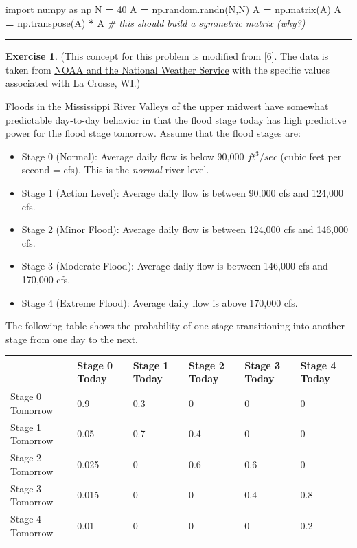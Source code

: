 \documentclass[
]{book}
\newenvironment{Shaded}{\begin{snugshade}}{\end{snugshade}}
\newcommand{\CommentTok}[1]{\textcolor[rgb]{0.56,0.35,0.01}{\textit{#1}}}
\newcommand{\DecValTok}[1]{\textcolor[rgb]{0.00,0.00,0.81}{#1}}
\newcommand{\ImportTok}[1]{#1}
\newcommand{\NormalTok}[1]{#1}
\newcommand{\OperatorTok}[1]{\textcolor[rgb]{0.81,0.36,0.00}{\textbf{#1}}}
\providecommand{\tightlist}{%
  \setlength{\itemsep}{0pt}\setlength{\parskip}{0pt}}
\theoremstyle{definition}
\theoremstyle{definition}
\theoremstyle{definition}
\newtheorem{exercise}{Exercise}[chapter]
\theoremstyle{remark}
\begin{document}
\begin{Shaded}
\begin{Highlighting}[]
\ImportTok{import}\NormalTok{ numpy }\ImportTok{as}\NormalTok{ np}
\NormalTok{N }\OperatorTok{=} \DecValTok{40}
\NormalTok{A }\OperatorTok{=}\NormalTok{ np.random.randn(N,N)}
\NormalTok{A }\OperatorTok{=}\NormalTok{ np.matrix(A)}
\NormalTok{A }\OperatorTok{=}\NormalTok{ np.transpose(A) }\OperatorTok{*}\NormalTok{ A }\CommentTok{\# this should build a symmetric matrix (why?)}
\end{Highlighting}
\end{Shaded}

\begin{center}\rule{0.5\linewidth}{0.5pt}\end{center}

\begin{exercise}
\protect\hypertarget{exr:unnamed-chunk-399}{}{\label{exr:unnamed-chunk-399} }(This concept for this problem is modified from {[}\protect\hyperlink{ref-meerschaert}{6}{]}. The data is taken from \href{https://www.weather.gov/arx/mississippi_river}{NOAA and the National Weather Service} with the specific values associated with La Crosse, WI.)

Floods in the Mississippi River Valleys of the upper midwest have somewhat predictable day-to-day behavior in that the flood stage today has high predictive power for the flood stage tomorrow. Assume that the flood stages are:

\begin{itemize}
\tightlist
\item
  Stage 0 (Normal): Average daily flow is below 90,000 \(ft^3/sec\) (cubic feet per second = cfs). This is the \emph{normal} river level.
\item
  Stage 1 (Action Level): Average daily flow is between 90,000 cfs and 124,000 cfs.
\item
  Stage 2 (Minor Flood): Average daily flow is between 124,000 cfs and 146,000 cfs.
\item
  Stage 3 (Moderate Flood): Average daily flow is between 146,000 cfs and 170,000 cfs.
\item
  Stage 4 (Extreme Flood): Average daily flow is above 170,000 cfs.
\end{itemize}

The following table shows the probability of one stage transitioning into another stage from one day to the next.

\begin{longtable}[]{@{}llllll@{}}
\toprule
& Stage 0 Today & Stage 1 Today & Stage 2 Today & Stage 3 Today & Stage 4 Today\tabularnewline
\midrule
\endhead
Stage 0 Tomorrow & 0.9 & 0.3 & 0 & 0 & 0\tabularnewline
Stage 1 Tomorrow & 0.05 & 0.7 & 0.4 & 0 & 0\tabularnewline
Stage 2 Tomorrow & 0.025 & 0 & 0.6 & 0.6 & 0\tabularnewline
Stage 3 Tomorrow & 0.015 & 0 & 0 & 0.4 & 0.8\tabularnewline
Stage 4 Tomorrow & 0.01 & 0 & 0 & 0 & 0.2\tabularnewline
\bottomrule
\end{longtable}


\end{exercise}
\end{document}
